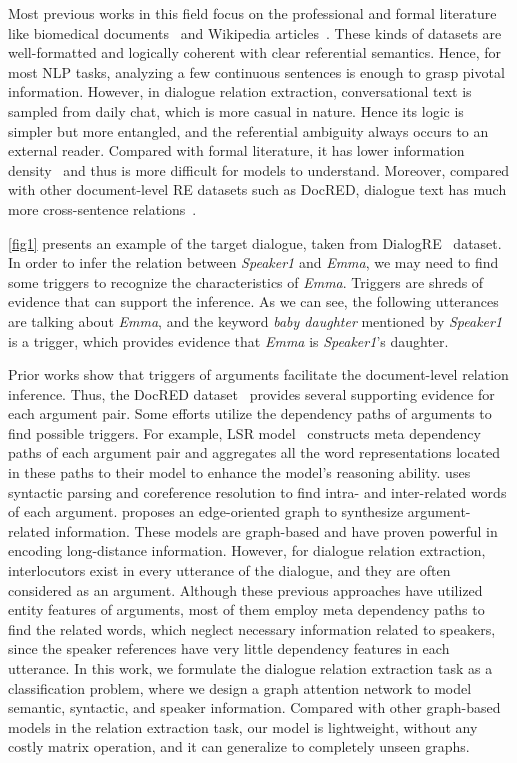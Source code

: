 \documentclass[11pt]{article}
\begin{document}
Most previous works in this field focus on the professional and formal literature like biomedical documents~\cite{li2016biocreative,wu2019renet} and Wikipedia articles~\cite{elsahar2018t,yao2019docred,mesquita2019knowledgenet}.
These kinds of datasets are well-formatted and logically coherent with clear referential semantics.
Hence, for most NLP tasks, analyzing a few continuous sentences is enough to grasp pivotal information.
However, in dialogue relation extraction, conversational text is sampled from daily chat, which is more casual in nature.
Hence its logic is simpler but more entangled, and the referential ambiguity always occurs to an external reader.
Compared with formal literature, it has lower information density~\cite{wang2011pilot} and thus is more difficult for models to understand. Moreover, compared with other document-level RE datasets such as DocRED, dialogue text has much more cross-sentence relations~\cite{yu2020dialogue}.

\cref{fig1} presents an example of the target dialogue,
taken from DialogRE~\cite{yu2020dialogue} dataset. In order to infer the relation between \textit{Speaker1} and \textit{Emma}, we may need to find some triggers to recognize the characteristics of \textit{Emma}.
Triggers are shreds of evidence that can support the inference. As we can see, the following utterances are talking about \textit{Emma}, and the keyword \textit{baby daughter} mentioned by \textit{Speaker1} is a trigger, which provides evidence that \textit{Emma} is \textit{Speaker1}'s daughter.

Prior works show that triggers of arguments facilitate the document-level relation inference. Thus, the DocRED dataset~\cite{yao2019docred} provides several supporting evidence for each argument pair. Some efforts utilize the dependency paths of arguments to find possible triggers. For example, LSR model~\cite{nan2020reasoning} constructs meta dependency paths of each argument pair and aggregates all the word representations located in these paths to their model to enhance the model's reasoning ability.
\citet{sahu2019inter} uses syntactic parsing and coreference resolution to find intra- and inter-related words of each argument. \citet{christopoulou2019connecting} proposes an edge-oriented graph to synthesize argument-related information.
These models are graph-based and have proven powerful in encoding long-distance information. However, for dialogue relation extraction, interlocutors exist in every utterance of the dialogue, and they are often considered as an argument. Although these previous approaches have utilized entity features of arguments, most of them employ meta dependency paths to find the related words, which neglect necessary information related to speakers, since the speaker references have very little dependency features in each utterance. In this work, we formulate the dialogue relation extraction task as a classification problem, where we design a graph attention network to model semantic, syntactic, and speaker information. Compared with other graph-based models in the relation extraction task, our model is lightweight, without any costly matrix operation, and it can generalize to completely unseen graphs.
\end{document}
